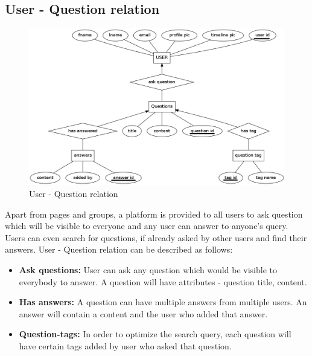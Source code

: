 \documentclass{article}
\begin{document}
\subsection{User - Question relation}
\begin{figure}[h]
\centering
\includegraphics[scale=0.4]{user_question.png}
\caption{User - Question relation}
\label{fig4}
\end{figure}
Apart from pages and groups, a platform is provided to all users to ask question which will be visible to everyone and any user can answer to anyone's query. Users can even search for questions, if already asked by other users and find their answers. User - Question relation can be described as follows:
\begin{itemize}
\item \textbf{Ask questions:} User can ask any question which would be visible to everybody to answer. A question will have attributes - question title, content.
\item \textbf{Has answers:} A question can have multiple answers from multiple users. An answer will contain a content and the user who added that answer.
\item \textbf{Question-tags:} In order to optimize the search query, each question will have certain tags added by user who asked that question. 
\end{itemize} 
\end{document}
